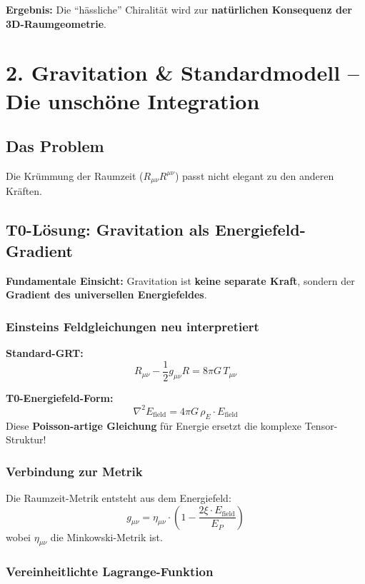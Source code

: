 	\textbf{Ergebnis:} Die ``hässliche'' Chiralität wird zur \textbf{natürlichen Konsequenz der 3D-Raumgeometrie}.
	
	
	
	\section*{2. Gravitation \& Standardmodell – Die unschöne Integration}
	
	\subsection*{Das Problem}
	Die Krümmung der Raumzeit ($R_{\mu\nu} R^{\mu\nu}$) passt nicht elegant zu den anderen Kräften.
	
	\subsection*{T0-Lösung: Gravitation als Energiefeld-Gradient}
	
	\textbf{Fundamentale Einsicht:} Gravitation ist \textbf{keine separate Kraft}, sondern der \textbf{Gradient des universellen Energiefeldes}.
	
	\subsubsection*{Einsteins Feldgleichungen neu interpretiert}
	
	\textbf{Standard-GRT:}
	\[
	R_{\mu\nu} - \frac{1}{2}g_{\mu\nu}R = 8\pi G \, T_{\mu\nu}
	\]
	
	\textbf{T0-Energiefeld-Form:}
	\[
	\boxed{\nabla^2 E_{\text{field}} = 4\pi G \, \rho_E \cdot E_{\text{field}}}
	\]
	Diese \textbf{Poisson-artige Gleichung} für Energie ersetzt die komplexe Tensor-Struktur!
	
	\subsubsection*{Verbindung zur Metrik}
	
	Die Raumzeit-Metrik entsteht aus dem Energiefeld:
	\[
	g_{\mu\nu} = \eta_{\mu\nu} \cdot \left(1 - \frac{2\xi \cdot E_{\text{field}}}{E_P}\right)
	\]
	wobei $\eta_{\mu\nu}$ die Minkowski-Metrik ist.
	
	\subsubsection*{Vereinheitlichte Lagrange-Funktion}
	
